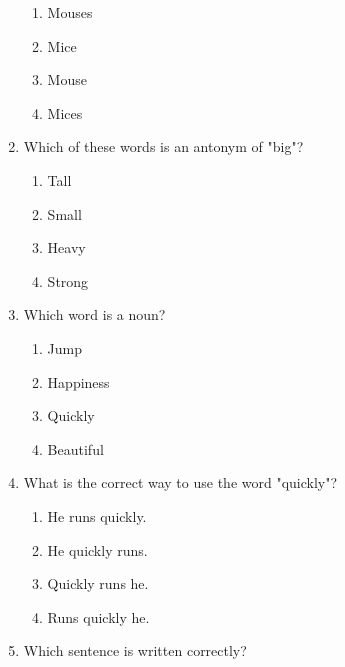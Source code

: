 \documentclass[12pt]{article}
\begin{document}
\begin{enumerate}
    \begin{enumerate}[label=\Alph*.]
        \item Mouses
        \item Mice
        \item Mouse
        \item Mices
    \end{enumerate}

    \vspace{0.5cm}

    \item Which of these words is an antonym of "big"?

    \begin{enumerate}[label=\Alph*.]
        \item Tall
        \item Small
        \item Heavy
        \item Strong
    \end{enumerate}

    \vspace{0.5cm}

    \item Which word is a noun?

    \begin{enumerate}[label=\Alph*.]
        \item Jump
        \item Happiness
        \item Quickly
        \item Beautiful
    \end{enumerate}

    \vspace{0.5cm}

    \item What is the correct way to use the word "quickly"?

    \begin{enumerate}[label=\Alph*.]
        \item He runs quickly.
        \item He quickly runs.
        \item Quickly runs he.
        \item Runs quickly he.
    \end{enumerate}

    \vspace{0.5cm}

    \item Which sentence is written correctly?


\end{enumerate}
\end{document}
